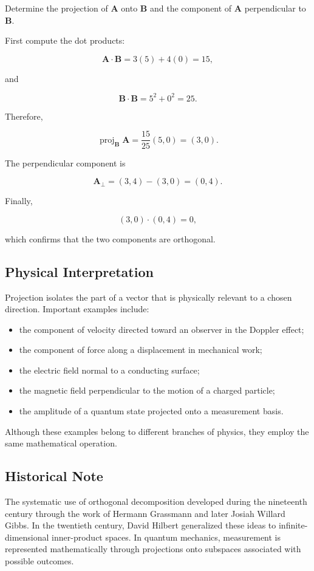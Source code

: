 Determine the projection of $\mathbf A$ onto $\mathbf B$ and the component of
$\mathbf A$ perpendicular to $\mathbf B$.

First compute the dot products:

\[
\mathbf A\cdot\mathbf B
=
3(5)+4(0)
=
15,
\]

and

\[
\mathbf B\cdot\mathbf B
=
5^2+0^2
=
25.
\]

Therefore,

\[
\operatorname{proj}_{\mathbf B}\mathbf A
=
\frac{15}{25}(5,0)
=
(3,0).
\]

The perpendicular component is

\[
\mathbf A_{\perp}
=
(3,4)-(3,0)
=
(0,4).
\]

Finally,

\[
(3,0)\cdot(0,4)=0,
\]

which confirms that the two components are orthogonal.

\subsection{Physical Interpretation}

Projection isolates the part of a vector that is physically relevant to a
chosen direction. Important examples include:

\begin{itemize}
\item the component of velocity directed toward an observer in the Doppler effect;
\item the component of force along a displacement in mechanical work;
\item the electric field normal to a conducting surface;
\item the magnetic field perpendicular to the motion of a charged particle;
\item the amplitude of a quantum state projected onto a measurement basis.
\end{itemize}

Although these examples belong to different branches of physics, they employ
the same mathematical operation.

\subsection{Historical Note}

The systematic use of orthogonal decomposition developed during the nineteenth
century through the work of Hermann Grassmann and later Josiah Willard Gibbs.
In the twentieth century, David Hilbert generalized these ideas to
infinite-dimensional inner-product spaces. In quantum mechanics, measurement
is represented mathematically through projections onto subspaces associated
with possible outcomes.

